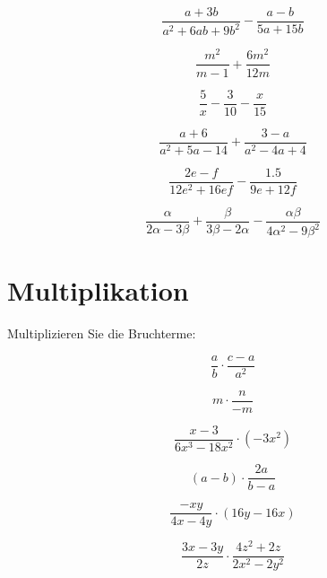 {\begin{bbwAufgabenBlock}
\item $$\frac{a+3b}{a^2+6ab+9b^2} - \frac{a-b}{5a+15b}$$

\item $$\frac{m^2}{m-1} + \frac{6m^2}{12m}$$

\item $$\frac5x - \frac3{10} - \frac{x}{15}$$

\item $$\frac{a+6}{a^2+5a-14} + \frac{3-a}{a^2-4a+4}$$
 
\item $$\frac{2e-f}{12e^2+16ef} - \frac{1.5}{9e+12f}$$


\item $$\frac{\alpha}{2\alpha -3\beta} + \frac{\beta}{3\beta-2\alpha}
- \frac{\alpha\beta}{4\alpha^2 - 9\beta^2}$$


\end{bbwAufgabenBlock}
\newpage
\section{Multiplikation}
Multiplizieren Sie die Bruchterme:

\begin{bbwAufgabenBlock}
\item $$\frac{a}b \cdot{} \frac{c-a}{a^2}$$

\item $$m \cdot{} \frac{n}{-m}$$

\item $$\frac{x-3}{6x^3-18x^2} \cdot{} \left(-3x^2\right)$$

\item $$(a-b) \cdot{} \frac{2a}{b-a}$$

\item $$\frac{-xy}{4x-4y} \cdot{} \left(16y-16x\right)$$

\item $$\frac{3x-3y}{2z} \cdot{} \frac{4z^2 + 2z}{2x^2-2y^2}$$
\end{bbwAufgabenBlock}
\newpage
}

